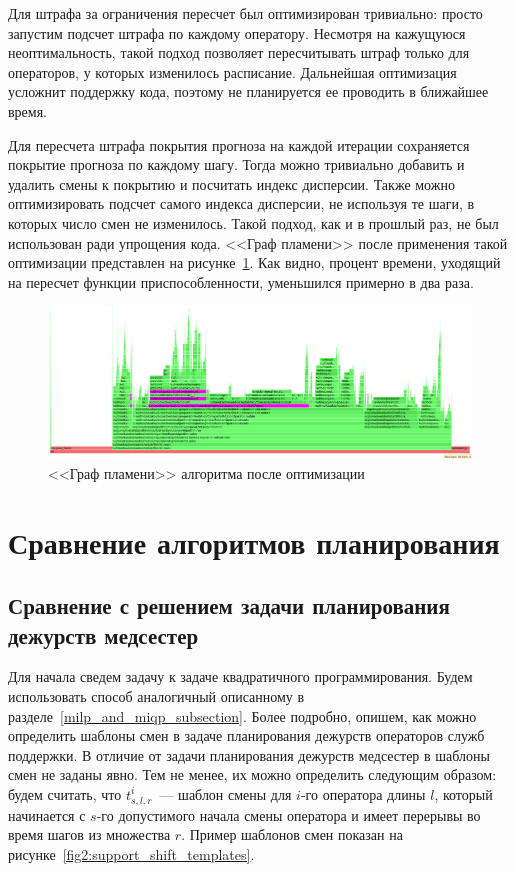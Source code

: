 \documentclass[times,specification,annotation]{itmo-student-thesis}
\begin{document}
Для штрафа за ограничения пересчет был оптимизирован тривиально: просто запустим подсчет штрафа по каждому оператору.
Несмотря на кажущуюся неоптимальность, такой подход позволяет пересчитывать штраф только для операторов, у которых изменилось расписание.
Дальнейшая оптимизация усложнит поддержку кода, поэтому не планируется ее проводить в ближайшее время.

Для пересчета штрафа покрытия прогноза на каждой итерации сохраняется покрытие прогноза по каждому шагу.
Тогда можно тривиально добавить и удалить смены к покрытию и посчитать индекс дисперсии.
Также можно оптимизировать подсчет самого индекса дисперсии, не используя те шаги, в которых число смен не изменилось.
Такой подход, как и в прошлый раз, не был использован ради упрощения кода.
<<Граф пламени>> после применения такой оптимизации представлен на рисунке~\ref{fig2:flame_graph_after_optimization}.
Как видно, процент времени, уходящий на пересчет функции приспособленности, уменьшился примерно в два раза.

\begin{figure}
\caption{<<Граф пламени>> алгоритма после оптимизации}\label{fig2:flame_graph_after_optimization}
\centering
\includegraphics[width=1\columnwidth]{after_optimization_flame.png}
\end{figure}

\section{Сравнение алгоритмов планирования}

\subsection{Сравнение с решением задачи планирования дежурств медсестер}

Для начала сведем задачу к задаче квадратичного программирования.
Будем использовать способ аналогичный описанному в разделе~\ref{milp_and_miqp_subsection}.
Более подробно, опишем, как можно определить шаблоны смен в задаче планирования дежурств операторов служб поддержки.
В отличие от задачи планирования дежурств медсестер в шаблоны смен не заданы явно.
Тем не менее, их можно определить следующим образом: будем считать, что $t^i_{s, l, r}$~--- шаблон смены для $i$-го оператора длины $l$, который начинается с $s$-го допустимого начала смены оператора и имеет перерывы во время шагов из множества $r$.
Пример шаблонов смен показан на рисунке~\ref{fig2:support_shift_templates}.
\end{document}

